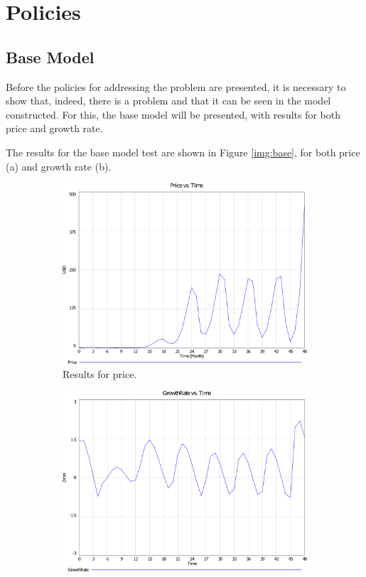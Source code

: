\section{Policies}
\subsection{Base Model}
	Before the policies for addressing the problem are presented, it is necessary to show that, indeed, there is a problem and that it can be seen in the model constructed. For this, the base model will be presented, with results for both price and growth rate.

	The results for the base model test are shown in Figure \ref{img:base}, for both price (a) and growth rate (b).
	\begin{figure}[H]
      \centering
      \begin{subfigure}[t]{0.4\textwidth}
        \includegraphics[scale = 0.3]{files/BasePrice.pdf}
        \centering
        \caption{Results for price.}
      \end{subfigure}
      \hspace{1cm}
      \begin{subfigure}[t]{0.4\textwidth}
        \includegraphics[scale = 0.3]{files/BaseGrowth.pdf}

\end{subfigure}
\end{figure}
